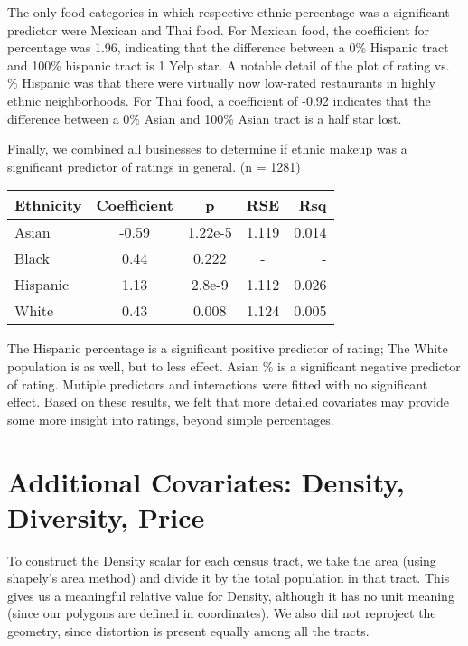 \documentclass[11pt,twocolumn]{article}
\begin{document}
The only food categories in which respective ethnic percentage was a significant predictor were Mexican and Thai food. For Mexican food, the coefficient for percentage was 1.96, indicating that the difference between a 0\% Hispanic tract and 100\% hispanic tract is 1 Yelp star. A notable detail of the plot of rating vs. \% Hispanic was that there were virtually now low-rated restaurants in highly ethnic neighborhoods. For Thai food, a coefficient of -0.92 indicates that the difference between a 0\% Asian and 100\% Asian tract is a half star lost.

Finally, we combined all businesses to determine if ethnic makeup was a significant predictor of ratings in general. (n = 1281)

\begin{center}
  \begin{tabular}{| l | c | c | c | r | }
    \hline
    Ethnicity & Coefficient & p & RSE & Rsq \\ \hline \hline
    Asian & -0.59 & 1.22e-5 & 1.119 & 0.014 \\ \hline
    Black & 0.44 & 0.222 & - & - \\ \hline
    Hispanic & 1.13 & 2.8e-9 & 1.112 & 0.026 \\ \hline
    White & 0.43 & 0.008 & 1.124 & 0.005 \\ \hline
  \end{tabular}
\end{center}

The Hispanic percentage is a significant positive predictor of rating; The White population is as well, but to less effect. Asian \% is a significant negative predictor of rating. Mutiple predictors and interactions were fitted with no significant effect. Based on these results, we felt that more detailed covariates may provide some more insight into ratings, beyond simple percentages.

\section{Additional Covariates: Density, Diversity, Price}

To construct the Density scalar for each census tract, we take the area (using shapely's area method) and divide it by the total population in that tract. This gives us a meaningful relative value for Density, although it has no unit meaning (since our polygons are defined in coordinates). We also did not reproject the geometry, since distortion is present equally among all the tracts. 
\end{document}
